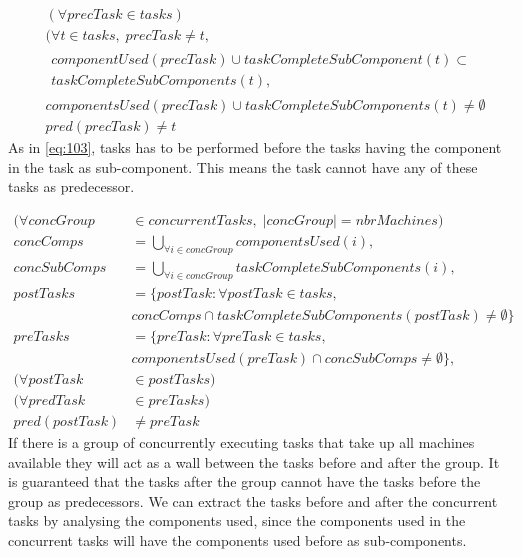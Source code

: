   \begin{equation}
  \begin{aligned}\label{eq:90}
  &(\forall precTask \in tasks) \\
  &(\forall t \in tasks, \; precTask \neq t,\\
  &\begin{aligned}componentUsed(precTask) \cup taskCompleteSubComponent(t) \subset\\
  taskCompleteSubComponents(t), \end{aligned}\\
  &componentsUsed(precTask) \cup taskCompleteSubComponents(t) \neq \emptyset \\
  &pred(precTask) \neq t
  \end{aligned}
  \end{equation}
 As in \ref{eq:103}, tasks has to be performed before the tasks having the component in the task as sub-component. This means the task cannot have any of these tasks as predecessor.
  
  \begin{equation}
  \begin{aligned}\label{eq:91}
  (\forall concGroup &\in concurrentTasks, \; |concGroup| = nbrMachines) \\
  concComps &= \bigcup_{\forall i \in concGroup}componentsUsed(i), \\
  concSubComps &= \bigcup_{\forall i \in concGroup}taskCompleteSubComponents(i), \\
  postTasks &= \{postTask : \forall postTask \in tasks,\\
  &concComps \cap taskCompleteSubComponents(postTask) \neq \emptyset\}\\
  preTasks &= \{preTask : \forall preTask \in tasks,\\
  &componentsUsed(preTask) \cap concSubComps \neq \emptyset\}, \\
  (\forall postTask &\in postTasks) \\
  (\forall predTask &\in preTasks) \\
  pred(postTask) &\neq preTask
  \end{aligned}
  \end{equation}
  If there is a group of concurrently executing tasks that take up all machines available they will act as a wall between the tasks before and after the group. It is guaranteed that the tasks after the group cannot have the tasks before the group as predecessors. We can extract the tasks before and after the concurrent tasks by analysing the components used, since the components used in the concurrent tasks will have the components used before as sub-components.
